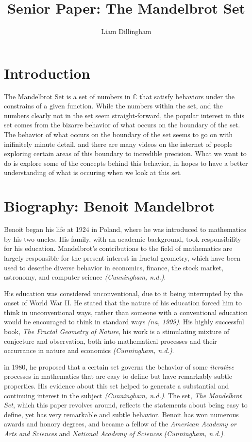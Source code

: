 \documentclass[20pt]{article} %
\title{Senior Paper: The Mandelbrot Set}
\author{Liam Dillingham}
\begin{document}
\maketitle

\section{Introduction}
The Mandelbrot Set is a set of numbers in $\mathbb{C}$ that satisfy behaviors under the constrains of a given function.  While the numbers within the set, and the numbers clearly not in the set seem straight-forward, the popular interest in this set comes from the bizarre behavior of what occurs on the boundary of the set.  The behavior of what occurs on the boundary of the set seems to go on with inifinitely minute detail, and there are many videos on the internet of people exploring certain areas of this boundary to incredible precision.  What we want to do is explore some of the concepts behind this behavior, in hopes to have a better understanding of what is occuring when we look at this set.

\section{Biography: Benoit Mandelbrot}
Benoit began his life at 1924 in Poland, where he was introduced to mathematics by his two uncles.  His family, with an academic background, took responsibility for his education. Mandelbrot's contributions to the field of mathematics are largely responsible for the present interest in fractal geometry, which have been used to describe diverse behavior in economics, finance, the stock market, astronomy, and computer science \textit{(Cunningham, n.d.)}.  

His education was considered unconventional, due to it being interrupted by the onset of World War II.  He stated that the nature of his education forced him to think in unconventional ways, rather than someone with a conventional education would be encouraged to think in standard ways \textit{(na, 1999)}.  His highly successful book, \textit{The Fractal Geometry of Nature}, his work is a stimulating mixture of conjecture and observation, both into mathematical processes and their occurrance in nature and economics \textit{(Cunningham, n.d.)}.

in 1980, he proposed that a certain set governs the behavior of some \textit{iterative} processes in mathematics that are easy to define but have remarkably subtle properties.  His evidence about this set helped to generate a substantial and continuing interest in the subject \textit{(Cunningham, n.d.)}.  The set, \textit{The Mandelbrot Set}, which this paper revolves around, reflects the statements about being easy to define, yet has very remarkable and subtle behavior. Benoit has won numerous awards and honory degrees, and became a fellow of the \textit{American Academy or Arts and Sciences} and \textit{National Academy of Sciences} \textit{(Cunningham, n.d.)}.
\end{document}
